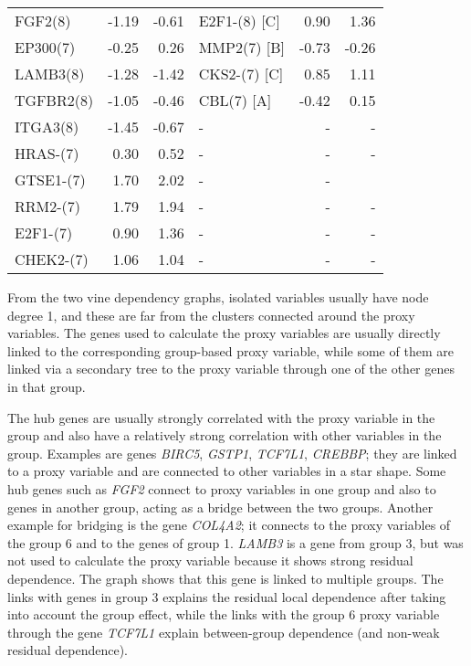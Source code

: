 \documentclass[a4paper]{article}
\begin{document}
\begin{table}[!ht]
\begin{tabular}{lrr|lrr}
 FGF2(8)& \multicolumn{1}{r}{-1.19}  & \multicolumn{1}{r|}{-0.61} &  E2F1-(8) [C]   & 0.90 & 1.36 \\
EP300(7)& \multicolumn{1}{r}{-0.25}  & \multicolumn{1}{r|}{0.26} &  MMP2(7)  [B]                    & -0.73 & -0.26\\
LAMB3(8)& \multicolumn{1}{r}{-1.28}  & \multicolumn{1}{r|}{-1.42} & CKS2-(7)  [C]         
& 0.85 & 1.11\\
TGFBR2(8)& \multicolumn{1}{r}{-1.05}  &  \multicolumn{1}{r|}{-0.46} &  CBL(7) [A]
& -0.42 & 0.15\\
ITGA3(8)& \multicolumn{1}{r}{-1.45}  &\multicolumn{1}{r|}{-0.67} &
-  & - &-\\
HRAS-(7)& \multicolumn{1}{r}{0.30}  & \multicolumn{1}{r|}{0.52} & - & -& -\\
GTSE1-(7)& \multicolumn{1}{r}{1.70}  & \multicolumn{1}{r|}{2.02} & -& -\\

RRM2-(7)& \multicolumn{1}{r}{1.79}  & \multicolumn{1}{r|}{1.94} & -  & - & -\\
E2F1-(7)& \multicolumn{1}{r}{0.90}  & \multicolumn{1}{r|}{1.36} & -   & - & -\\
CHEK2-(7)& \multicolumn{1}{r}{1.06}  & \multicolumn{1}{r|}{1.04} & -   & - & -\\

\bottomrule
\end{tabular}
\label{tab-hub-genes}
\end{table}

From the two vine dependency graphs, isolated variables usually have
node degree 1, and these are far from the clusters connected around
the proxy variables.  The genes used to calculate the proxy variables
are usually directly linked to the corresponding group-based proxy
variable, while some of them are linked via a secondary tree to the
proxy variable through one of the other genes in that group.

The hub genes are usually strongly correlated with the proxy variable
in the group and also have a relatively strong correlation with other
variables in the group.  Examples are genes \textit{BIRC5},
\textit{GSTP1}, \textit{TCF7L1}, \textit{CREBBP}; they are linked to a
proxy variable and are connected to other variables in a star shape.
Some hub genes such as \textit{FGF2} connect to proxy variables in one
group and also to genes in another group, acting as a bridge between
the two groups.  Another example for bridging is the gene
\textit{COL4A2}; it connects to the proxy variables of the group {6}
and to the genes of group {1}.  \textit{LAMB3} is a gene from group
{3}, but was not used to calculate the proxy variable because it shows
strong residual dependence.  The graph shows that this gene is linked
to multiple groups.  The links with genes in group {3} explains the
residual local dependence after taking into account the group effect,
while the links with the group {6} proxy variable through the gene
\textit{TCF7L1} explain between-group dependence (and non-weak
residual dependence).
\end{document}
